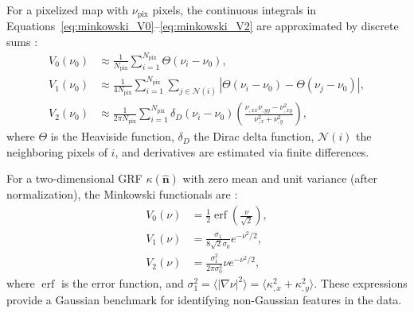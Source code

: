 For a pixelized map with $\nu_{\mathrm{pix}}$ pixels, the continuous integrals in Equations~\eqref{eq:minkowski_V0}--\eqref{eq:minkowski_V2} are approximated by discrete sums \citep{2012PhRvD..85j3513K}:
\begin{align}
    V_0(\nu_0) &\approx \frac{1}{N_{\mathrm{pix}}} \sum_{i=1}^{N_{\mathrm{pix}}} \Theta(\nu_i - \nu_0), \label{eq:V0_discrete} \\
    V_1(\nu_0) &\approx \frac{1}{4N_{\mathrm{pix}}} \sum_{i=1}^{N_{\mathrm{pix}}} \sum_{j \in \mathcal{N}(i)} |\Theta(\nu_i - \nu_0) - \Theta(\nu_j - \nu_0)|, \label{eq:V1_discrete} \\
    V_2(\nu_0) &\approx \frac{1}{2\pi N_{\mathrm{pix}}} \sum_{i=1}^{N_{\mathrm{pix}}} \delta_D(\nu_i - \nu_0) \left( \frac{\nu_{,xx} \nu_{,yy} - \nu_{,xy}^2}{\nu_{,x}^2 + \nu_{,y}^2} \right), \label{eq:V2_discrete}
\end{align}
where $\Theta$ is the Heaviside function, $\delta_D$ the Dirac delta function, $\mathcal{N}(i)$ the neighboring pixels of $i$, and derivatives are estimated via finite differences.

For a two-dimensional GRF $\kappa(\hat{\mathbf{n}})$ with zero mean and unit variance (after normalization), the Minkowski functionals are \citep{2010PhRvD..81h3505M}: 
\begin{align}
    V_0(\nu) &= \frac{1}{2} \operatorname{erf}\left( \frac{\nu}{\sqrt{2}} \right), \label{eq:V0_GRF} \\
    V_1(\nu) &= \frac{\sigma_1}{8\sqrt{2}\sigma_0} e^{-\nu^2/2}, \label{eq:V1_GRF} \\
    V_2(\nu) &= \frac{\sigma_1^2}{2\pi \sigma_0^3} \nu e^{-\nu^2/2}, \label{eq:V2_GRF}
\end{align}
where $\operatorname{erf}$ is the error function, and $\sigma_1^2 = \langle |\nabla \nu|^2 \rangle = \langle \kappa_{,x}^2 + \kappa_{,y}^2 \rangle$. These expressions provide a Gaussian benchmark for identifying non-Gaussian features in the data.